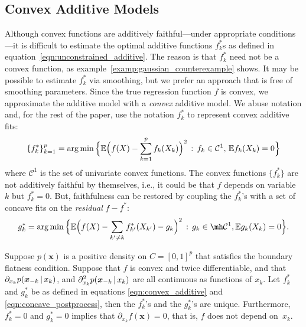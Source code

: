 \subsection{Convex Additive Models}

Although convex functions are additively faithful---under appropriate conditions---it is difficult to
estimate the optimal additive functions $f^*_k$s as defined in
equation~\eqref{eqn:unconstrained_additive}.  The reason is that $f^*_k$ need not be
a convex function, as example~\ref{examp:gaussian_counterexample}
shows. It may be possible to estimate $f^*_k$ via smoothing, but we prefer an approach that is free of smoothing parameters. 
Since the true regression function $f$ is convex, we approximate the additive model with a \emph{convex} additive model. We abuse notation and, for the rest of the paper, use the notation $f^*_k$ to represent convex additive fits:
\begin{equation}
\label{eqn:convex_additive}
\{ f^*_k \}_{k=1}^p = \arg\min \Big \{ 
    {\mathbb E}\Bigl( f(X) - \sum_{k=1}^p f_k(X_k) \Bigr)^2 \,:\, f_k \in \mathcal{C}^1, \, {\mathbb E} f_k(X_k) = 0 \Big \}
\end{equation}
where $\mathcal{C}^1$ is the set of univariate convex functions. 
The convex functions $\{f^*_k\}$ are not additively faithful by
themselves, i.e., it could be that $f$ depends on variable $k$ but $f^*_k = 0$. But, faithfulness can be restored by coupling the $f^*_k$'s with a set of concave fits on the \emph{residual} $f - f^*$:
\begin{equation}
\label{eqn:concave_postprocess}
g^*_k = \arg\min \Big\{
   \E\Bigl( f(X) - \sum_{k' \neq k} f^*_{k'}(X_{k'}) - g_k \Bigr)^2
    \,:\, g_k \in \mh \mathcal{C}^1, \E g_k(X_k) = 0 
  \Big\}.
\end{equation}


\begin{theorem}
\label{thm:acdc_faithful}
Suppose $p(\mathbf{x})$ is a positive density on $C=[0,1]^p$ that
satisfies the boundary flatness condition. Suppose that $f$ is convex
and twice differentiable, and that $\partial_{x_k} p( \mbox{\boldmath $x$}_{-k} {\,|\,} x_k )$, and
$\partial_{x_k}^2 p( \mbox{\boldmath $x$}_{-k} {\,|\,} x_k)$ are all continuous
as functions of $x_k$.  Let $f^*_k$ and $g^*_k$ be as defined in equations
\eqref{eqn:convex_additive} and \eqref{eqn:concave_postprocess}, then the $f^*_k$'s and the $g^*_k$'s are unique. Furthermore, 
$f^*_k = 0$ and $g^*_k = 0$ implies that $\partial_{x_k} f(\mathbf{x})
= 0$, that is, $f$ does not depend on~$x_k$. 
\end{theorem}

